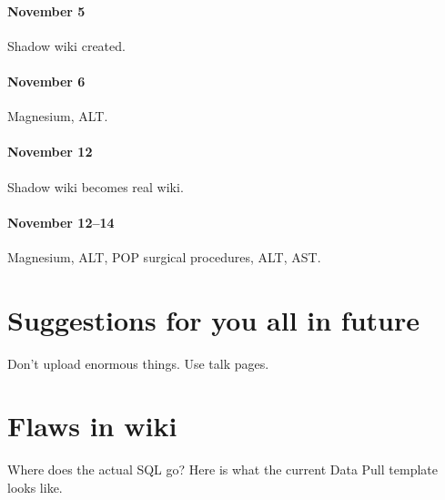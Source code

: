 \documentclass{tufte-handout}
\begin{document}
\paragraph{November 5} Shadow wiki created.

\paragraph{November 6} Magnesium, ALT.

\paragraph{November 12} Shadow wiki becomes real wiki.

\paragraph{November 12--14} Magnesium, ALT, POP surgical procedures,
ALT, AST.

\section{Suggestions for you all in future}

Don't upload enormous things. Use talk pages. 

\section{Flaws in wiki}

Where does the actual SQL go? Here is what the current Data Pull
template looks like.
\end{document}
